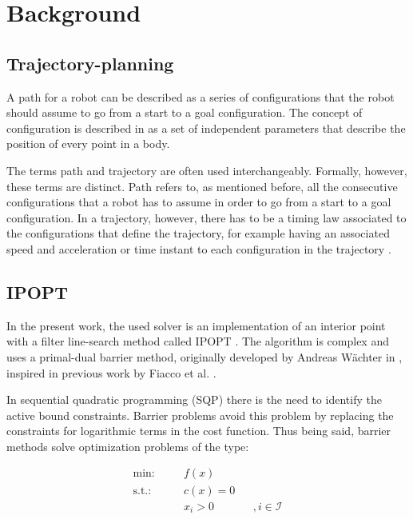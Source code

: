 \section{Background}

\subsection{Trajectory-planning}
A path for a robot can be described as a series of configurations that the robot should assume to go from a start to a goal configuration. The concept of configuration is described in \cite{ref:configurationSpace} as a set of independent parameters that describe the position of every point in a body.
\par
The terms path and trajectory are often used interchangeably. Formally, however, these terms are distinct. Path refers to, as mentioned before, all the consecutive configurations that a robot has to assume in order to go from a start to a goal configuration. In a trajectory, however, there has to be a timing law associated to the configurations that define the trajectory, for example having an associated speed and acceleration or time instant to each configuration in the trajectory \cite{ref:modelingPlanningControl}.

\subsection{IPOPT}
\label{subSeq:IPOPT}
In the present work, the used solver is an implementation of an interior point with a filter line-search method called IPOPT \cite{IPOPT}. The algorithm is complex and uses a primal-dual barrier method, originally developed by Andreas Wächter in \cite{ref:IPOPTthesis}, inspired in previous work by Fiacco et al. \cite{fiacco}.
\par
In sequential quadratic programming (SQP) there is the need to identify the active bound constraints. Barrier problems avoid this problem by replacing the constraints for logarithmic terms in the cost function. Thus being said, barrier methods solve optimization problems of the type:

\begin{equation}
    \begin{matrix}
    \text{min:} && \quad f(x) && \\
    \text{s.t.:} && \quad c(x)=0 && \\
     && \quad  x_i > 0 && , i \in \mathcal{I}
    \end{matrix}
    \label{eq:barrierProblem}
\end{equation}

